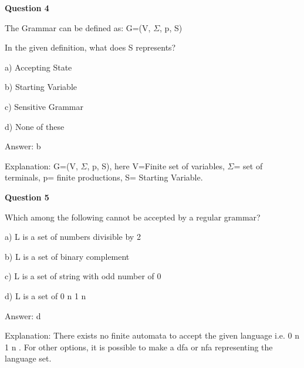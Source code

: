 \documentclass{article}
\begin{document}
\begin{mdframed}[linewidth=1pt, roundcorner=5pt, linecolor=gray!30, backgroundcolor=gray!5]
\textbf{Question 4} 

The Grammar can be defined as: G=(V, $\Sigma$, p, S)

In the given definition, what does S represents?

a) Accepting State

b) Starting Variable

c) Sensitive Grammar

d) None of these
\vspace{5pt} \par
\begin{tcolorbox}[colback=green!5, colframe=green!40!black, title=Solution]
Answer: b

Explanation: G=(V, $\Sigma$, p, S), here V=Finite set of variables,  $\Sigma$= set of terminals, p= finite productions, S= Starting Variable.
\end{tcolorbox}
\end{mdframed}

\begin{mdframed}[linewidth=1pt, roundcorner=5pt, linecolor=gray!30, backgroundcolor=gray!5]
\textbf{Question 5} 

Which among the following cannot be accepted by  a regular grammar?

a) L is a set of numbers divisible by 2

b) L is a set of binary complement

c) L is a set of string with odd number of 0

d) L is a set of 0
n
1
n
\vspace{5pt} \par
\begin{tcolorbox}[colback=green!5, colframe=green!40!black, title=Solution]
Answer: d

Explanation: There exists no finite automata to accept the given language i.e. 0
n
1
n
. For other options, it is possible to make a dfa or nfa representing the language set.
\end{tcolorbox}
\end{mdframed}
\end{document}
